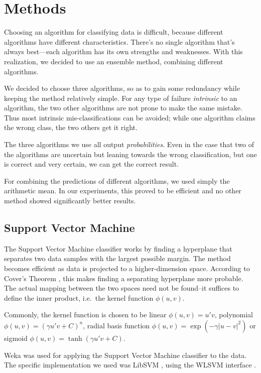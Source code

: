 \section{Methods} \label{sec:methods}

Choosing an algorithm for classifying data is difficult, because
different algorithms have different characteristics. There's no single
algorithm that's always best---each algorithm has its own strengths and
weaknesses. With this realization, we decided to use an ensemble method,
combining different algorithms.

We decided to choose three algorithms, so as to gain some redundancy
while keeping the method relatively simple. For any type of failure
\emph{intrinsic} to an algorithm, the two other algorithms are not prone
to make the same mistake. Thus most intrinsic mis-classifications can be
avoided; while one algorithm claims the wrong class, the two others get
it right.

The three algorithms we use all output \emph{probabilities}. Even in the
case that two of the algorithms are uncertain but leaning towards the
wrong classification, but one is correct and very certain, we can get
the correct result.

For combining the predictions of different algorithms, we used simply
the arithmetic mean. In our experiments, this proved to be efficient and
no other method showed significantly better results.

\subsection{Support Vector Machine}

The Support Vector Machine classifier works by finding a hyperplane that
separates two data samples with the largest possible margin. The method
becomes efficient as data is projected to a higher-dimension space.
According to Cover's Theorem \cite{cover1965geometrical}, this makes finding a separating hyperplane
more probable. The actual mapping between the two spaces need not be
found--it suffices to define the inner product, i.e.~the kernel function
$\phi(u,v)$. \cite{cortes1995support}

Commonly, the kernel function is chosen to be linear $\phi(u,v) = u' v$,
polynomial $\phi(u,v) = (\gamma u' v + C)^n$, radial basis function
$\phi(u,v) = \exp(-\gamma |u-v|^2)$ or sigmoid
$\phi(u,v) = \tanh(\gamma u' v + C)$.

Weka \cite{weka} was used for applying the Support Vector Machine
classifier to the data. The specific implementation we used was LibSVM
\cite{libsvm}, using the WLSVM interface \cite{wlsvm}.

